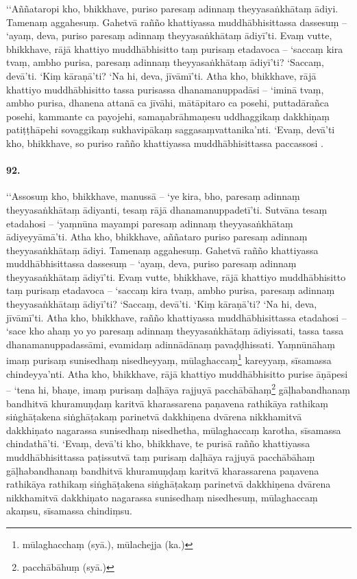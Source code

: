 ‘‘Aññataropi kho, bhikkhave, puriso paresaṃ adinnaṃ theyyasaṅkhātaṃ ādiyi. Tamenaṃ aggahesuṃ. Gahetvā rañño khattiyassa muddhābhisittassa dassesuṃ – ‘ayaṃ, deva, puriso paresaṃ adinnaṃ theyyasaṅkhātaṃ ādiyī’ti. Evaṃ vutte, bhikkhave, rājā khattiyo muddhābhisitto taṃ purisaṃ etadavoca – ‘saccaṃ kira tvaṃ, ambho purisa, paresaṃ adinnaṃ theyyasaṅkhātaṃ ādiyī’ti? ‘Saccaṃ, devā’ti. ‘Kiṃ kāraṇā’ti? ‘Na hi, deva, jīvāmī’ti. Atha kho, bhikkhave, rājā khattiyo muddhābhisitto tassa purisassa dhanamanuppadāsi – ‘iminā tvaṃ, ambho purisa, dhanena attanā ca jīvāhi, mātāpitaro ca posehi, puttadārañca posehi, kammante ca payojehi, samaṇabrāhmaṇesu uddhaggikaṃ dakkhiṇaṃ patiṭṭhāpehi sovaggikaṃ sukhavipākaṃ saggasaṃvattanika’nti. ‘Evaṃ, devā’ti kho, bhikkhave, so puriso rañño khattiyassa muddhābhisittassa paccassosi .

\paragraph{92.} ‘‘Assosuṃ kho, bhikkhave, manussā – ‘ye kira, bho, paresaṃ adinnaṃ theyyasaṅkhātaṃ ādiyanti, tesaṃ rājā dhanamanuppadetī’ti. Sutvāna tesaṃ etadahosi – ‘yaṃnūna mayampi paresaṃ adinnaṃ theyyasaṅkhātaṃ ādiyeyyāmā’ti. Atha kho, bhikkhave, aññataro puriso paresaṃ adinnaṃ theyyasaṅkhātaṃ ādiyi. Tamenaṃ aggahesuṃ. Gahetvā rañño khattiyassa muddhābhisittassa dassesuṃ – ‘ayaṃ, deva, puriso paresaṃ adinnaṃ theyyasaṅkhātaṃ ādiyī’ti. Evaṃ vutte, bhikkhave, rājā khattiyo muddhābhisitto taṃ purisaṃ etadavoca – ‘saccaṃ kira tvaṃ, ambho purisa, paresaṃ adinnaṃ theyyasaṅkhātaṃ ādiyī’ti? ‘Saccaṃ, devā’ti. ‘Kiṃ kāraṇā’ti? ‘Na hi, deva, jīvāmī’ti. Atha kho, bhikkhave, rañño khattiyassa muddhābhisittassa etadahosi – ‘sace kho ahaṃ yo yo paresaṃ adinnaṃ theyyasaṅkhātaṃ ādiyissati, tassa tassa dhanamanuppadassāmi, evamidaṃ adinnādānaṃ pavaḍḍhissati. Yaṃnūnāhaṃ imaṃ purisaṃ sunisedhaṃ nisedheyyaṃ, mūlaghaccaṃ\footnote{mūlaghacchaṃ (syā.), mūlachejja (ka.)} kareyyaṃ, sīsamassa chindeyya’nti. Atha kho, bhikkhave, rājā khattiyo muddhābhisitto purise āṇāpesi – ‘tena hi, bhaṇe, imaṃ purisaṃ daḷhāya rajjuyā pacchābāhaṃ\footnote{pacchābāhuṃ (syā.)} gāḷhabandhanaṃ bandhitvā khuramuṇḍaṃ karitvā kharassarena paṇavena rathikāya rathikaṃ siṅghāṭakena siṅghāṭakaṃ parinetvā dakkhiṇena dvārena nikkhamitvā dakkhiṇato nagarassa sunisedhaṃ nisedhetha, mūlaghaccaṃ karotha, sīsamassa chindathā’ti. ‘Evaṃ, devā’ti kho, bhikkhave, te purisā rañño khattiyassa muddhābhisittassa paṭissutvā taṃ purisaṃ daḷhāya rajjuyā pacchābāhaṃ gāḷhabandhanaṃ bandhitvā khuramuṇḍaṃ karitvā kharassarena paṇavena rathikāya rathikaṃ siṅghāṭakena siṅghāṭakaṃ parinetvā dakkhiṇena dvārena nikkhamitvā dakkhiṇato nagarassa sunisedhaṃ nisedhesuṃ, mūlaghaccaṃ akaṃsu, sīsamassa chindiṃsu.

